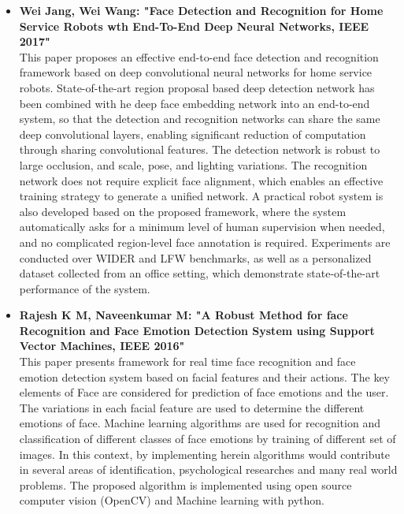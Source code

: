 \documentclass[oneside,a4paper,12pt]{report}
\begin{document}
\begin{normalsize}
\begin{itemize}
	\item \textbf{Wei Jang, Wei Wang:  "Face Detection and Recognition for Home Service Robots wth End-To-End Deep Neural Networks, IEEE 2017"} \cite{jiang17_face} \\
	This paper proposes an effective end-to-end face detection and recognition framework based on deep convolutional neural networks for home service robots. State-of-the-art region proposal based deep detection network has been combined with he deep face embedding network into an end-to-end system, so that the detection and recognition networks can share the same deep convolutional layers, enabling significant reduction of computation through sharing convolutional features. The detection network is robust to large occlusion, and scale, pose, and lighting variations. The recognition network does  not require explicit face alignment, which enables an effective training strategy to generate a unified network. A practical robot system is also developed based on the proposed framework, where the system automatically asks for a minimum level of human supervision when needed, and no complicated region-level face annotation is required. Experiments are conducted over WIDER and LFW benchmarks, as well as a personalized dataset collected from an office setting, which demonstrate state-of-the-art performance of the system.
		\vspace{5mm}
	\item \textbf{Rajesh K M, Naveenkumar M:  "A Robust Method for face Recognition and Face Emotion Detection System using Support Vector Machines,  IEEE 2016"} \cite{rajesh16} \\
	This paper presents framework for real time face recognition and face emotion detection system based on facial features and their actions. The key elements of Face are considered for prediction of face emotions and the user. The variations in each facial feature are used to determine the different emotions of face. Machine learning algorithms are used for recognition and classification of different classes of face emotions by training of different set of images. In this context, by implementing herein algorithms would contribute in several areas of identification, psychological researches and many real world problems. The proposed algorithm is implemented using open source computer vision (OpenCV) and Machine learning with python.
	

\end{itemize}
\end{normalsize}
\end{document}
